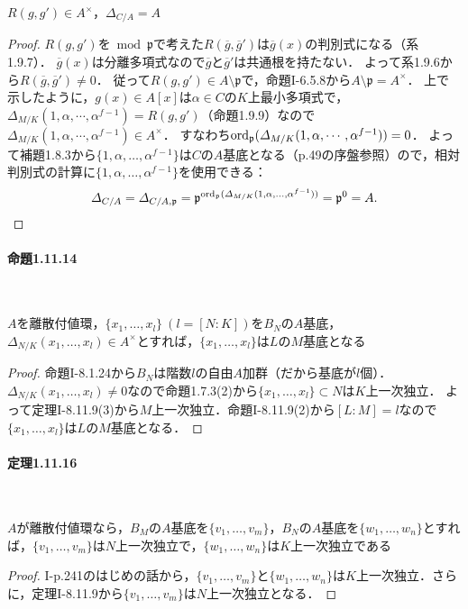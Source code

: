\begin{screen}
  $R(g,g')\in A^\times$，$\varDelta_{C/A}=A$
\end{screen}
\begin{proof}
  $R(g,g')$を$\bmod\mathfrak{p}$で考えた$R(\overline{g},\overline{g}')$は$\overline{g}(x)$の判別式になる（系1.9.7）．
  $\overline{g}(x)$は分離多項式なので$\overline{g}$と$\overline{g}'$は共通根を持たない．
  よって系1.9.6から$R(\overline{g},\overline{g}')\neq 0$．
  従って$R(g,g')\in A\setminus\mathfrak{p}$で，命題I-6.5.8から$A\setminus\mathfrak{p}=A^\times$．
  上で示したように，$g(x)\in A[x]$は$\alpha\in C$の$K$上最小多項式で，$\varDelta_{M/K}(1,\alpha,\cdots,\alpha^{f-1}) = R(g,g')$（命題1.9.9）なので$\varDelta_{M/K}(1,\alpha,\cdots,\alpha^{f-1})\in A^\times$．
  すなわち$\operatorname{ord}_\mathfrak{p}(\varDelta_{M/K}(1,\alpha,\cdots,\alpha^{f-1}))=0$．
  よって補題1.8.3から$\{1,\alpha,\ldots,\alpha^{f-1}\}$は$C$の$A$基底となる（p.49の序盤参照）ので，相対判別式の計算に$\{1,\alpha,\ldots,\alpha^{f-1}\}$を使用できる：
  \[\varDelta_{C/A}=\varDelta_{C/A,\mathfrak{p}}=\mathfrak{p}^{\operatorname{ord}_\mathfrak{p}(\varDelta_{M/K}(1,\alpha,\ldots,\alpha^{f-1}))}=\mathfrak{p}^{0}=A.\]
\end{proof}

\paragraph{命題1.11.14}~
\begin{screen}
  $A$を離散付値環，$\{x_1,\ldots,x_l\}\ (l=[N:K])$を$B_N$の$A$基底，$\varDelta_{N/K}(x_1,\ldots,x_l)\in A^\times$とすれば，$\{x_1,\ldots,x_l\}$は$L$の$M$基底となる
\end{screen}
\begin{proof}
  命題I-8.1.24から$B_N$は階数$l$の自由$A$加群（だから基底が$l$個）．
  $\varDelta_{N/K}(x_1,\ldots,x_l)\neq 0$なので命題1.7.3(2)から$\{x_1,\ldots,x_l\}\subset N$は$K$上一次独立．
  よって定理I-8.11.9(3)から$M$上一次独立．命題I-8.11.9(2)から$[L:M]=l$なので$\{x_1,\ldots,x_l\}$は$L$の$M$基底となる．
\end{proof}

\paragraph{定理1.11.16}~
\begin{screen}
  $A$が離散付値環なら，$B_M$の$A$基底を$\{v_1,\ldots,v_m\}$，$B_N$の$A$基底を$\{w_1,\ldots,w_n\}$とすれば，$\{v_1,\ldots,v_m\}$は$N$上一次独立で，$\{w_1,\ldots,w_n\}$は$K$上一次独立である
\end{screen}
\begin{proof}
  I-p.241のはじめの話から，$\{v_1,\ldots,v_m\}$と$\{w_1,\ldots,w_n\}$は$K$上一次独立．さらに，定理I-8.11.9から$\{v_1,\ldots,v_m\}$は$N$上一次独立となる．
\end{proof}

